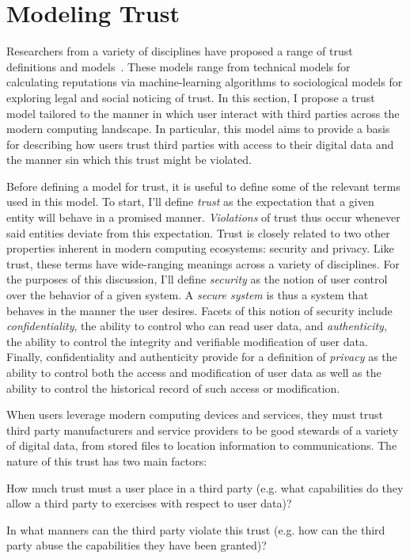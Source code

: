 \section{Modeling Trust}
\label{sec:model}

Researchers from a variety of disciplines have proposed a range of
trust definitions and models~\cite{grandison2000, camp2003,
  sabater2005, flowerday2006}. These models range from technical
models for calculating reputations via machine-learning algorithms to
sociological models for exploring legal and social noticing of
trust. In this section, I propose a trust model tailored to the manner
in which user interact with third parties across the modern computing
landscape. In particular, this model aims to provide a basis for
describing how users trust third parties with access to their digital
data and the manner sin which this trust might be violated.

Before defining a model for trust, it is useful to define some of the
relevant terms used in this model. To start, I'll define
\textit{trust} as the expectation that a given entity will behave in a
promised manner. \textit{Violations} of trust thus occur whenever said
entities deviate from this expectation. Trust is closely related to
two other properties inherent in modern computing ecosystems: security
and privacy. Like trust, these terms have wide-ranging meanings across
a variety of disciplines. For the purposes of this discussion, I'll
define \textit{security} as the notion of user control over the
behavior of a given system. A \textit{secure system} is thus a system
that behaves in the manner the user desires. Facets of this notion of
security include \textit{confidentiality}, the ability to control who
can read user data, and \textit{authenticity}, the ability to control
the integrity and verifiable modification of user data. Finally,
confidentiality and authenticity provide for a definition of
\textit{privacy} as the ability to control both the access and
modification of user data as well as the ability to control the
historical record of such access or modification.

When users leverage modern computing devices and services, they must
trust third party manufacturers and service providers to be good
stewards of a variety of digital data, from stored files to location
information to communications. The nature of this trust has two main
factors:

\begin{packed_desc}
\item[Degree:] How much trust must a user place in a third party
  (e.g. what capabilities do they allow a third party to exercises with
  respect to user data)?
\item[Risk:] In what manners can the third party violate this trust
  (e.g. how can the third party abuse the capabilities they have been
  granted)?
\end{packed_desc}

